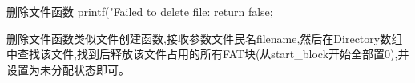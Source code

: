 \begin{itemize}
\begin{ccode}{删除文件函数}
{    printf("Failed to delete file: %
    return false;
}
    \end{ccode}
    删除文件函数类似文件创建函数,接收参数文件民名filename,然后在Directory数组中查找该文件,找到后释放该文件占用的所有FAT块(从start\_block开始全部置0),并设置为未分配状态即可。
   \end{itemize}
